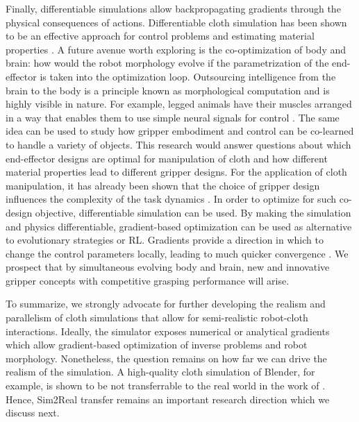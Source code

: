 \documentclass[\home/main.tex]{subfiles}
\begin{document}
Finally, differentiable simulations allow backpropagating gradients through the physical consequences of actions. Differentiable cloth simulation has been shown to be an effective approach for control problems and estimating material properties \autocite{Junbang2019,li2021diffcloth}.
A future avenue worth exploring is the co-optimization of body and brain: how would the robot morphology evolve if the parametrization of the end-effector is taken into the optimization loop. Outsourcing intelligence from the brain to the body is a principle known as morphological computation \autocite{Rolf2006} and is highly visible in nature. For example, legged animals have their muscles arranged in a way that enables them to use simple neural signals for control .  The same idea can be used to study how gripper embodiment and control can be co-learned to handle a variety of objects. This research would answer questions about which end-effector designs are optimal for manipulation of cloth and how different material properties lead to different gripper designs. For the application of cloth manipulation, it has already been shown that the choice of gripper design influences the complexity of the task dynamics \autocite{Borras2020}. In order to optimize for such co-design objective, differentiable simulation can be used. By making the simulation and physics differentiable, gradient-based optimization can be used as alternative to evolutionary strategies or \gls{RL}. Gradients provide a direction in which to change the control parameters locally, leading to much quicker convergence \autocite{Degrave2019} .
We prospect that by simultaneous evolving body and brain, new and innovative gripper concepts with competitive grasping performance will arise. 

To summarize, we strongly advocate for further developing the realism and parallelism of cloth simulations that allow for semi-realistic robot-cloth interactions. Ideally, the simulator exposes numerical or analytical gradients which allow gradient-based optimization of inverse problems and robot morphology. Nonetheless, the question remains on how far we can drive the realism of the simulation. A high-quality cloth simulation of Blender, for example, is shown to be not transferrable to the real world in the work of \autocite{Tanaka2018}. Hence, Sim2Real transfer remains an important research direction which we discuss next. 
\end{document}
